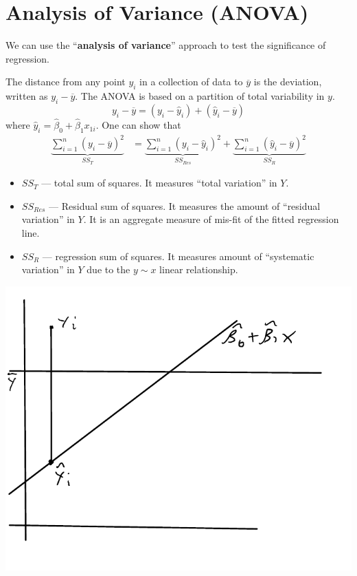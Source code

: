 \documentclass[12 pt]{article}
\begin{document}
    \section{Analysis of Variance (ANOVA)}
    We can use the ``\textbf{analysis of variance}'' approach to test
    the significance of regression.

    The distance from any point $y_i$ in a collection of data to
    $\overline{y}$ is the deviation, written as $y_i - \overline{y}$.
    The ANOVA is based on a partition of total variability in $y$.
    $$y_i - \overline{y} = (y_i - \hat{y}_i) + (\hat{y}_i -
    \overline{y})$$
    where $\hat{y}_i = \hat{\beta}_0 + \hat{\beta}_1 x_{1i}$. One can
    show that
    \begin{align*}
      \underbrace{\sum_{i=1}^n (y_i - \overline{y})^2}_{SS_T} & = \underbrace{\sum_{i=1}^n (y_i - \hat{y}_i)^2}_{SS_{Res}} + \underbrace{\sum_{i=1}^n (\hat{y}_i - \overline{y})^2}_{SS_R}
    \end{align*}
    \begin{itemize}
    \item $SS_T$ --- total sum of squares. It measures ``total
      variation'' in $Y$.
    \item $SS_{Res}$ --- Residual sum of squares. It measures the
      amount of ``residual variation'' in $Y$. It is an aggregate
      measure of mis-fit of the fitted regression line.
    \item $SS_R$ --- regression sum of squares. It measures amount of
      ``systematic variation'' in $Y$ due to the $y \sim x$ linear relationship.
    \end{itemize}
    \begin{minipage}{.5\linewidth}
    \includegraphics[width=\textwidth]{18.pdf}
    \end{minipage}
\end{document}
